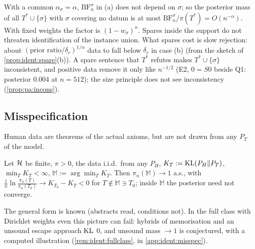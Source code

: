 \begin{remark}\label{rem:ident:sparetotal}
With a common $\alpha_\sigma=\alpha$, $\mathrm{BF}^\sigma_n$ in (a) does not depend on $\sigma$; so the posterior mass of all $T^*\cup\{\sigma\}$ with $\sigma$ covering no datum is at most $\mathrm{BF}^\sigma_n/\pi(T^*)=O(n^{-\alpha})$. With fixed weights the factor is $(1-w_\sigma)^n$. Spares inside the support do not threaten identification of the instance union. What spares cost is slow rejection: about $(\text{prior ratio}/\delta_r)^{1/\alpha}$ data to fall below $\delta_r$ in case (b) (from the sketch of \cref{prop:ident:spare}(b)). A spare sentence that $T^*$ refutes makes $T^*\cup\{\sigma\}$ inconsistent, and positive data remove it only like $n^{-1/2}$ (E2, $0=S0$ beside Q1: posterior $0.004$ at $n=512$); the size principle does not see inconsistency (\cref{prop:pa:incons}).
\end{remark}

\subsection{Misspecification}\label{sec:ident:misspec}

Human data are theorems of the actual axioms, but are not drawn from any $P_T$ of the model.

\begin{theorem}\label{thm:ident:kl}
Let $\mathcal{H}$ be finite, $\pi>0$, the data i.i.d.\ from any $P_H$, $K_T:=\mathrm{KL}(P_H\|P_T)$, $\min_TK_T<\infty$, $\mathbb M:=\arg\min_TK_T$. Then $\pi_n(\mathbb M)\to1$ a.s., with $\frac1n\ln\frac{\pi_n(T)}{\pi_n(T_0)}\to K_{T_0}-K_T<0$ for $T\notin\mathbb M\ni T_0$; inside $\mathbb M$ the posterior need not converge.
\end{theorem}

\noindent The general form is known \citep{berk1966limiting,kleijn2006misspecification} (abstracts read, conditions not). In the full class with Dirichlet weights even this picture can fail: hybrids of memorisation and an unsound escape approach $\mathrm{KL}$ $0$, and unsound mass $\to1$ is conjectured, with a computed illustration (\cref{rem:ident:fullclass}, in \cref{app:ident:misspec}).

